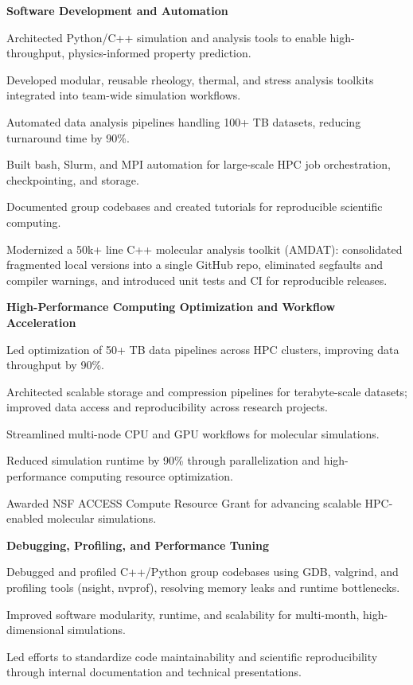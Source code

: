 \documentclass[letterpaper,12pt]{article}
\begin{document}
\vspace{0.5em}
\textbf{Software Development and Automation}
\begin{tabitemize}[leftmargin=*]
    \item Architected Python/C++ simulation and analysis tools to enable high-throughput, physics-informed property prediction.
    \item Developed modular, reusable rheology, thermal, and stress analysis toolkits integrated into team-wide simulation workflows.
    \item Automated data analysis pipelines handling 100+ TB datasets, reducing turnaround time by 90\%.
    \item Built bash, Slurm, and MPI automation for large-scale HPC job orchestration, checkpointing, and storage.
    \item Documented group codebases and created tutorials for reproducible scientific computing.
    \item Modernized a 50k+ line C++ molecular analysis toolkit (AMDAT): consolidated fragmented local versions into a single GitHub repo, eliminated segfaults and compiler warnings, and introduced unit tests and CI for reproducible releases.
\end{tabitemize}

\vspace{0.5em}
\textbf{High-Performance Computing Optimization and Workflow Acceleration}
\begin{tabitemize}[leftmargin=*]
    \item Led optimization of 50+ TB data pipelines across HPC clusters, improving data throughput by 90\%.
    \item Architected scalable storage and compression pipelines for terabyte-scale datasets; improved data access and reproducibility across research projects.
    \item Streamlined multi-node CPU and GPU workflows for molecular simulations.
    \item Reduced simulation runtime by 90\% through parallelization and high-performance computing resource optimization.
    \item Awarded NSF ACCESS Compute Resource Grant for advancing scalable HPC-enabled molecular simulations.
\end{tabitemize}

\vspace{0.5em}
\textbf{Debugging, Profiling, and Performance Tuning}
\begin{tabitemize}[leftmargin=*]
    \item Debugged and profiled C++/Python group codebases using GDB, valgrind, and profiling tools (nsight, nvprof), resolving memory leaks and runtime bottlenecks.
    \item Improved software modularity, runtime, and scalability for multi-month, high-dimensional simulations.
    \item Led efforts to standardize code maintainability and scientific reproducibility through internal documentation and technical presentations.
\end{tabitemize}
\end{document}
